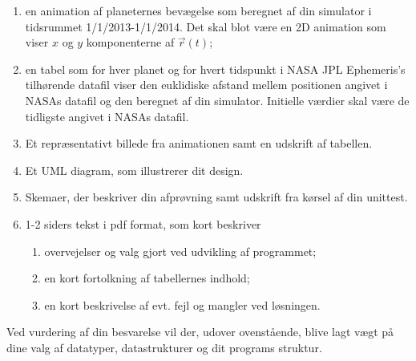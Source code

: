 \documentclass{article}
\begin{document}
\begin{enumerate}[label=11g.\arabic*,start=0]
  \begin{enumerate}
  \item en animation af planeternes bevægelse som beregnet af din simulator i tidsrummet 1/1/2013-1/1/2014. Det skal blot være en 2D animation som viser $x$ og $y$ komponenterne af $\vec{r}(t)$;  
  \item en tabel som for hver planet og for hvert tidspunkt i NASA JPL Ephemeris's tilhørende datafil viser den euklidiske afstand mellem positionen angivet i NASAs datafil og den beregnet af din simulator. Initielle værdier skal være de tidligste angivet i NASAs datafil.
\item Et repræsentativt billede fra animationen samt en udskrift af tabellen.
\item Et UML diagram, som illustrerer dit design.
\item Skemaer, der beskriver din afprøvning samt udskrift fra kørsel af din unittest.
\item 1-2 siders tekst i pdf format, som kort beskriver
  \begin{enumerate}
  \item overvejelser og valg gjort ved udvikling af programmet;
  \item en kort fortolkning af tabellernes indhold;
  \item en kort beskrivelse af evt. fejl og mangler ved løsningen.
\end{enumerate}
\end{enumerate}
Ved vurdering af din besvarelse vil der, udover ovenstående, blive lagt vægt på dine valg af datatyper, datastrukturer og dit programs struktur.



\end{enumerate}
\end{document}
